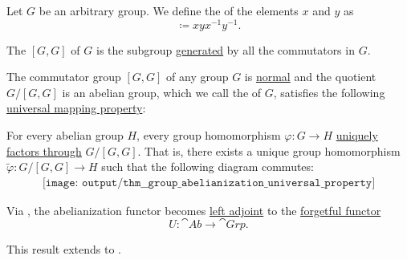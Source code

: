 
\begin{definition}\label{def:group_commutator}
  Let \( G \) be an arbitrary group. We define the  of the elements \( x \) and \( y \) as
  \begin{equation*}
    [x, y] \coloneqq xyx^{-1}y^{-1}.
  \end{equation*}

  The  \( [G, G] \) of \( G \) is the subgroup \hyperref[def:group/submodel]{generated} by all the commutators in \( G \).
\end{definition}

\begin{theorem}\label{thm:group_abelianization_universal_property}
  The commutator group \( [G, G] \) of any group \( G \) is \hyperref[thm:normal_subgroup_equivalences]{normal} and the quotient \( G / [G, G] \) is an abelian group, which we call the  of \( G \), satisfies the following \hyperref[rem:universal_mapping_property]{universal mapping property}:
  \begin{displayquote}
    For every abelian group \( H \), every group homomorphism \( \varphi: G \to H \) \hyperref[def:factors_through]{uniquely factors through} \( G / [G, G] \). That is, there exists a unique group homomorphism \( \widetilde{\varphi}: G / [G, G] \to H \) such that the following diagram commutes:
    \begin{equation}\label{eq:thm:group_abelianization_universal_property/diagram}
      \begin{aligned}
        \texttt{[image: output/thm\_\_group\_abelianization\_universal\_property]}
      \end{aligned}
    \end{equation}
  \end{displayquote}

  Via , the abelianization functor becomes \hyperref[def:category_adjunction]{left adjoint} to the \hyperref[def:concrete_category]{forgetful functor}
  \begin{equation*}
    U: \cat{Ab} \to \cat{Grp}.
  \end{equation*}

  This result extends to .
\end{theorem}
